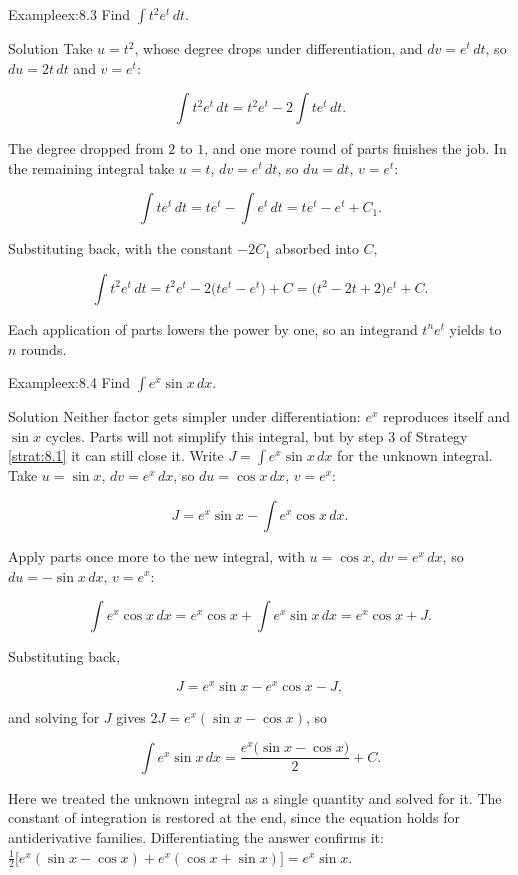 \documentclass[a4paper,12pt,oneside]{memoir}
\begin{document}
\begin{workedexample}
\begin{envexample}{Example}{ex:8.3}{}
Find \(\displaystyle\int t^{2}e^{t}\,dt\).
\end{envexample}
\begin{envsolution}{Solution}{}{}
Take \(u = t^{2}\), whose degree drops under differentiation, and \(dv = e^{t}\,dt\), so \(du = 2t\,dt\) and \(v = e^{t}\):

\[ \int t^{2}e^{t}\,dt = t^{2}e^{t} - 2\int t e^{t}\,dt. \]

The degree dropped from \(2\) to \(1\), and one more round of parts finishes the job. In the remaining integral take \(u = t\), \(dv = e^{t}\,dt\), so \(du = dt\), \(v = e^{t}\):

\[ \int t e^{t}\,dt = t e^{t} - \int e^{t}\,dt = t e^{t} - e^{t} + C_1. \]

Substituting back, with the constant \(-2C_{1}\) absorbed into \(C\),

\[ \int t^{2}e^{t}\,dt = t^{2}e^{t} - 2\bigl(t e^{t} - e^{t}\bigr) + C = \bigl(t^{2} - 2t + 2\bigr)e^{t} + C. \]

Each application of parts lowers the power by one, so an integrand \(t^{n}e^{t}\) yields to \(n\) rounds. \qedmark
\end{envsolution}
\end{workedexample}
\begin{workedexample}
\begin{envexample}{Example}{ex:8.4}{}
Find \(\displaystyle\int e^{x}\sin x\,dx\).
\end{envexample}
\begin{envsolution}{Solution}{}{}
Neither factor gets simpler under differentiation: \(e^{x}\) reproduces itself and \(\sin x\) cycles. Parts will not simplify this integral, but by step 3 of Strategy \ref{strat:8.1} it can still close it. Write \(J = \int e^{x}\sin x\,dx\) for the unknown integral. Take \(u = \sin x\), \(dv = e^{x}\,dx\), so \(du = \cos x\,dx\), \(v = e^{x}\):

\[ J = e^{x}\sin x - \int e^{x}\cos x\,dx. \]

Apply parts once more to the new integral, with \(u = \cos x\), \(dv = e^{x}\,dx\), so \(du = -\sin x\,dx\), \(v = e^{x}\):

\[ \int e^{x}\cos x\,dx = e^{x}\cos x + \int e^{x}\sin x\,dx = e^{x}\cos x + J. \]

Substituting back,

\[ J = e^{x}\sin x - e^{x}\cos x - J, \]

and solving for \(J\) gives \(2J = e^{x}(\sin x - \cos x)\), so

\[ \int e^{x}\sin x\,dx = \frac{e^{x}\bigl(\sin x - \cos x\bigr)}{2} + C. \]

Here we treated the unknown integral as a single quantity and solved for it. The constant of integration is restored at the end, since the equation holds for antiderivative families. Differentiating the answer confirms it: \(\tfrac{1}{2}\bigl[e^{x}(\sin x - \cos x) + e^{x}(\cos x + \sin x)\bigr] = e^{x}\sin x\). \qedmark
\end{envsolution}
\end{workedexample}
\end{document}
